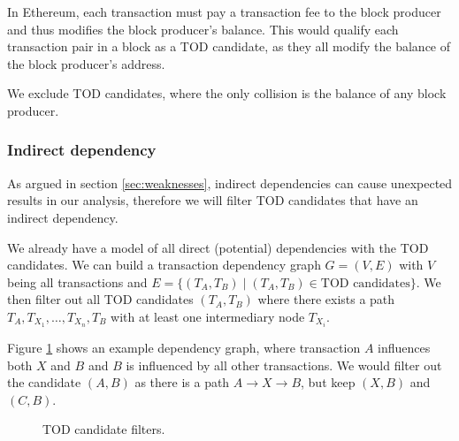 \documentclass[draft,final]{vutinfth} %
\begin{document}
In Ethereum, each transaction must pay a transaction fee to the block producer and thus modifies the block producer's balance. This would qualify each transaction pair in a block as a TOD candidate, as they all modify the balance of the block producer's address.

We exclude TOD candidates, where the only collision is the balance of any block producer.

\subsubsection{Indirect dependency}

As argued in section \ref{sec:weaknesses}, indirect dependencies can cause unexpected results in our analysis, therefore we will filter TOD candidates that have an indirect dependency.

We already have a model of all direct (potential) dependencies with the TOD candidates. We can build a transaction dependency graph $G = (V, E)$ with $V$ being all transactions and $E = \{ (T_A, T_B) \mid (T_A, T_B) \in \text{TOD candidates} \}$. We then filter out all TOD candidates $(T_A, T_B)$ where there exists a path $T_A, T_{X_1}, \dots, T_{X_n}, T_B$ with at least one intermediary node $T_{X_i}$.

Figure \ref{fig:tod_candidate_dependency} shows an example dependency graph, where transaction $A$ influences both $X$ and $B$ and $B$ is influenced by all other transactions. We would filter out the candidate $(A, B)$ as there is a path $A \rightarrow X \rightarrow B$, but keep $(X, B)$ and $(C, B)$.

\begin{figure}[h]
    \centering
    \caption{TOD candidate filters.}
    \label{fig:tod_candidate_dependency}
\end{figure}
\end{document}
